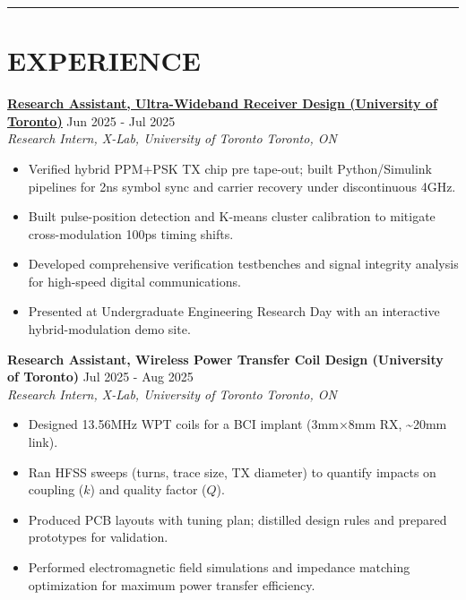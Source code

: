 \documentclass[letterpaper,10pt]{article}
\begin{document}
\noindent\rule{\linewidth}{1pt}

\section*{\textbf{EXPERIENCE}}

\noindent\href{https://github.com/Ken-2511/ppm-psk-visualize}
{\uline{\textbf{Research Assistant, Ultra-Wideband Receiver Design (University of Toronto)}}} \hfill Jun 2025 - Jul 2025\\
\textit{Research Intern, X-Lab, University of Toronto} \hfill \textit{Toronto, ON}
\begin{itemize}[leftmargin=0.2in]
    \item Verified hybrid PPM+PSK TX chip pre tape-out; built Python/Simulink pipelines for 2ns symbol sync and carrier recovery under discontinuous 4GHz.
	\item Built pulse-position detection and K-means cluster calibration to mitigate cross-modulation 100ps timing shifts.
    \item Developed comprehensive verification testbenches and signal integrity analysis for high-speed digital communications.
    \item Presented at Undergraduate Engineering Research Day with an interactive hybrid-modulation demo site.
\end{itemize}

\vspace{0.2cm}
\noindent\textbf{Research Assistant, Wireless Power Transfer Coil Design (University of Toronto)} \hfill Jul 2025 - Aug 2025\\
\textit{Research Intern, X-Lab, University of Toronto} \hfill \textit{Toronto, ON}
\begin{itemize}[leftmargin=0.2in]
    \item Designed 13.56MHz WPT coils for a BCI implant (3mm×8mm RX, \textasciitilde20mm link).
    \item Ran HFSS sweeps (turns, trace size, TX diameter) to quantify impacts on coupling ($k$) and quality factor ($Q$).
    \item Produced PCB layouts with tuning plan; distilled design rules and prepared prototypes for validation.
    \item Performed electromagnetic field simulations and impedance matching optimization for maximum power transfer efficiency.
\end{itemize}
\end{document}

